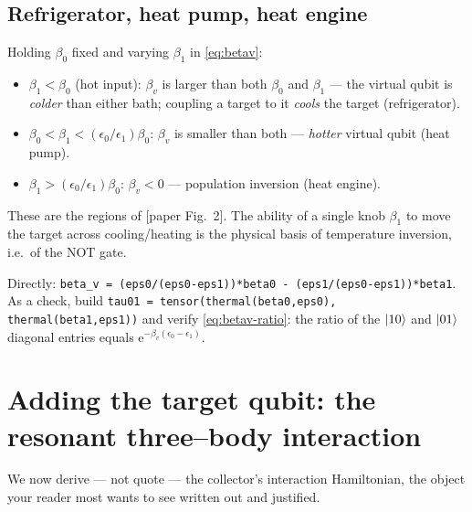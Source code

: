 \documentclass[11pt,a4paper]{article}
\newcommand{\ee}{\mathrm{e}}
\theoremstyle{definition}
\theoremstyle{remark}
\begin{document}
\subsection{Refrigerator, heat pump, heat engine}
Holding $\beta_0$ fixed and varying $\beta_1$ in \eqref{eq:betav}:
\begin{itemize}[leftmargin=*]
\item $\beta_1<\beta_0$ (hot input): $\beta_v$ is larger than both
$\beta_0$ and $\beta_1$ --- the virtual qubit is \emph{colder} than
either bath; coupling a target to it \emph{cools} the target
(refrigerator).
\item $\beta_0<\beta_1<(\epsilon_0/\epsilon_1)\beta_0$: $\beta_v$ is
smaller than both --- \emph{hotter} virtual qubit (heat pump).
\item $\beta_1>(\epsilon_0/\epsilon_1)\beta_0$: $\beta_v<0$ ---
population inversion (heat engine).
\end{itemize}
These are the regions of [paper Fig.~2]. The ability of a single knob
$\beta_1$ to move the target across cooling/heating is the physical basis
of temperature inversion, i.e.\ of the NOT gate.

\begin{implbox}
Directly: \texttt{beta\_v = (eps0/(eps0-eps1))*beta0 -
(eps1/(eps0-eps1))*beta1}. As a check, build
\texttt{tau01 = tensor(thermal(beta0,eps0), thermal(beta1,eps1))} and
verify \eqref{eq:betav-ratio}: the ratio of the $\ket{10}$ and
$\ket{01}$ diagonal entries equals $\ee^{-\beta_v(\epsilon_0-\epsilon_1)}$.
\end{implbox}

\section{Adding the target qubit: the resonant three--body interaction}
\label{sec:interaction}

We now derive --- not quote --- the collector's interaction Hamiltonian,
the object your reader most wants to see written out and justified.
\end{document}
